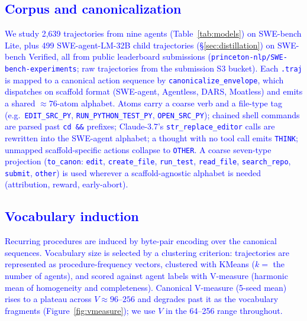 \documentclass[12pt]{article}
\begin{document}
\subsection{\textcolor{blue}{Corpus and canonicalization}}
\textcolor{blue}{We study 2{,}639 trajectories from nine agents (Table~\ref{tab:models}) on SWE-bench Lite, plus 499 SWE-agent-LM-32B child trajectories (\S\ref{sec:distillation}) on SWE-bench Verified, all from public leaderboard submissions (\texttt{princeton-nlp/SWE-bench-experiments}; raw trajectories from the submission S3 bucket). Each \texttt{.traj} is mapped to a canonical action sequence by \texttt{canonicalize\_envelope}, which dispatches on scaffold format (SWE-agent, Agentless, DARS, Moatless) and emits a shared ${\approx}76$-atom alphabet. Atoms carry a coarse verb and a file-type tag (e.g.\ \texttt{EDIT\_SRC\_PY}, \texttt{RUN\_PYTHON\_TEST\_PY}, \texttt{OPEN\_SRC\_PY}); chained shell commands are parsed past \texttt{cd\,\&\&} prefixes; Claude-3.7's \texttt{str\_replace\_editor} calls are rewritten into the SWE-agent alphabet; a thought with no tool call emits \texttt{THINK}; unmapped scaffold-specific actions collapse to \texttt{OTHER}. A coarse seven-type projection (\texttt{to\_canon}: \texttt{edit}, \texttt{create\_file}, \texttt{run\_test}, \texttt{read\_file}, \texttt{search\_repo}, \texttt{submit}, \texttt{other}) is used wherever a scaffold-agnostic alphabet is needed (attribution, reward, early-abort).}

\subsection{\textcolor{blue}{Vocabulary induction}}
\textcolor{blue}{Recurring procedures are induced by byte-pair encoding over the canonical sequences. Vocabulary size is selected by a clustering criterion: trajectories are represented as procedure-frequency vectors, clustered with KMeans ($k=$ the number of agents), and scored against agent labels with V-measure (harmonic mean of homogeneity and completeness). Canonical V-measure (5-seed mean) rises to a plateau across $V\approx96$--$256$ and degrades past it as the vocabulary fragments (Figure~\ref{fig:vmeasure}); we use $V$ in the 64--256 range throughout.}
\end{document}
